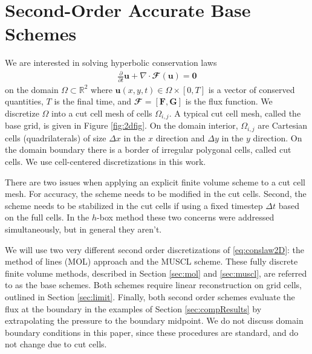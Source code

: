 \section{Second-Order Accurate Base Schemes}\label{sec:basefv}
We are interested in solving hyperbolic conservation laws 
\begin{equation}
\begin{aligned} \label{eq:conslaw2D}
\frac{\partial}{\partial t}	\mathbf{u} + \nabla \cdot
\mathbfcal{F}(\mathbf{u})  = \mathbf{0}
\end{aligned}
\end{equation}
on the domain $\Omega \subset \mathbb{R}^2$ where $\mathbf{u}(x,y,t) \in \Omega \times [0,T]$ is a vector of conserved quantities, $T$ is the final time, and $\mathbfcal{F} = [\mathbf{F}, \mathbf{G}]$ is the flux function.  We discretize $\Omega$ into a cut cell mesh of cells $\Omega_{i,j}$.  A typical cut cell mesh, called the base grid, is given in Figure \ref{fig:2dfig}.  On the domain interior, $\Omega_{i,j}$ are Cartesian cells (quadrilaterals) of size $\Delta x$ in the $x$ direction and $\Delta y$ in the $y$ direction.  On the domain boundary there is a border of irregular polygonal cells, called cut cells.  
We use cell-centered discretizations in this work.



There are two issues when applying an explicit finite volume scheme to a cut cell
mesh.  For accuracy, the scheme needs to be modified in the cut cells. Second, 
the scheme needs to be stabilized in the cut cells if using a fixed timestep $\Delta t$ 
based on the full cells. In the $h$-box method these two concerns were addressed
simultaneously, but in general they aren't.

We will use two very different second order discretizations of \eqref{eq:conslaw2D}: the method of lines
(MOL) approach and the MUSCL scheme.
These fully discrete finite volume methods, described in Section \ref{sec:mol} and \ref{sec:muscl},
are referred to as the base schemes.  Both schemes require linear 
reconstruction on grid cells,
outlined in Section \ref{sec:limit}.  
Finally, both second order schemes evaluate the flux at
the boundary in the examples of Section \ref{sec:compResults} by extrapolating the
pressure to the boundary midpoint. 
We do not discuss domain boundary conditions in this paper,  since 
these procedures are  standard, and do not change due to cut cells.

